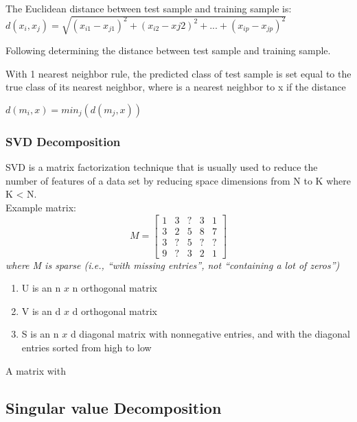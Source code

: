 \documentclass[10pt,a4paper]{article}
\begin{document}
		The Euclidean distance between test sample and training sample is: 
		\
		$d(x_{i},x_{j}) = \sqrt{(x_{i1} - x_{j1})^2 + (x_{i2} - x{j2})^2 + ... + (x_{ip} - x_{jp})^2}$
		
		Following determining the distance between test sample and training sample. 
		
		With 1 nearest neighbor rule, the predicted class of test sample is set equal to the true class of its nearest neighbor, where is a nearest neighbor to x if the distance 
		
		$d(m_{i},x) = min_{j}(d(m_{j},x))$
		
		
		
		\subsubsection{SVD Decomposition}
		SVD is a matrix factorization technique that is usually used to reduce the number of features of a data set by reducing space dimensions from N to K where K < N. \\
		Example matrix:
			\[
     			M=
  				\begin{bmatrix}
    					1 & 3 & ? & 3 & 1 \\
    					3 & 2 & 5 & 8 & 7 \\
    					3 & ? & 5 & ? & ? \\
    					9 & ? & 3 & 2 & 1
  				\end{bmatrix}
			\]
			\textit{ where M is sparse (i.e., “with missing entries”, not “containing a lot of zeros”)}
			
			
			\begin{enumerate}
				\item U is an n $x$ n orthogonal matrix
				\item V is an d $x$ d orthogonal matrix
				\item S is an n $x$ d diagonal matrix with nonnegative entries, and with the diagonal entries
sorted from high to low 
			\end{enumerate}
			
			A matrix with 
			

		
		\begin{algorithm}

		\end{algorithm}
		
	\subsection{Singular value Decomposition}
	
\end{document}
